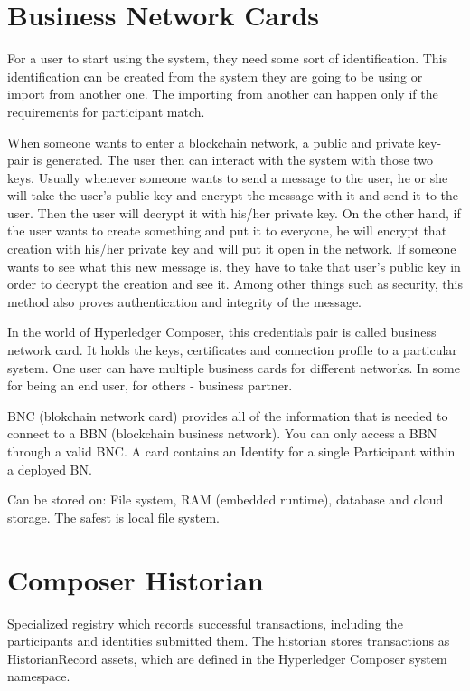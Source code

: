 \documentclass[a4paper,11pt]{report}
\begin{document}
\section{Business Network Cards}
\label{bna}

For a user to start using the system, they need some sort of identification. This identification can be created from the system they are going to be using or import from another one. The importing from another can happen only if the requirements for participant match.	

When someone wants to enter a blockchain network, a public and private key-pair is  generated. The user then can interact with the system with those two keys. Usually whenever someone wants to send a message to the user, he or she will take the user’s public key and encrypt the message with it and send it to the user. Then the user will decrypt it with his/her private key. On the other hand, if the user wants to create something and put it to everyone, he will encrypt that creation with his/her private key and will put it open in the network. If someone wants to see what this new message is, they have to take that user’s public key in order to decrypt the creation and see it. Among other things such as security, this method also proves authentication and integrity of the message. 

In the world of Hyperledger Composer, this credentials pair is called business network card. It holds the keys, certificates and connection profile to a particular system. One user can have multiple business cards for different networks. In some for being an end user, for others - business partner. 

BNC (blokchain network card) provides all of the information that is needed to connect to a BBN (blockchain business network). You can only access a BBN through a valid BNC. A card contains an Identity for a single Participant within a deployed BN.

Can be stored on: File system, RAM (embedded runtime), database and cloud storage. The safest is local file system.



\section{Composer Historian}

Specialized registry which records successful transactions, including the participants and identities submitted them. The historian stores transactions as HistorianRecord assets, which are defined in the Hyperledger Composer system namespace.
\end{document}

